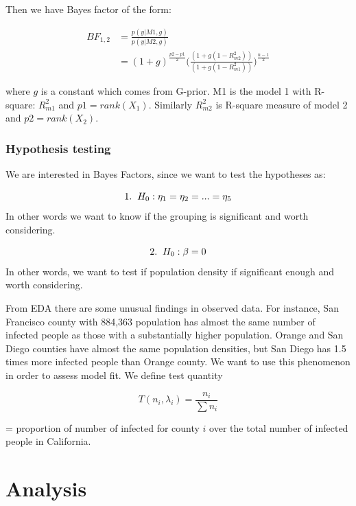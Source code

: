 \documentclass[11pt,twocolumn]{asaproc}
\begin{document}
Then we have Bayes factor of the form: 

\begin{align*}
BF_{1,2} & = \frac{p(y | M1, g)}{p(y | M2, g)} \\
&= (1+g)^{\frac{p2-p1}{2}}\Big(\frac{(1+g(1-R^2_{m2}))}{(1+g(1-R^2_{m1}))}\Big)^{\frac{n-1}{2}}
\end{align*}

where $g$ is a constant which comes from G-prior. M1 is the model 1 with R-square: $R^2_{m1}$ and $p1 = rank(X_1)$. Similarly $R^2_{m2}$ is R-square measure of model 2 and $p2 = rank(X_2)$. 



\subsubsection{Hypothesis testing}
We are interested in Bayes Factors, since we want to test the hypotheses as: 

$$1. \hspace{2mm} H_0: \eta_1 = \eta_2 = ... = \eta_5$$ In other words we want to know if the grouping is significant and worth considering. 

$$2. \hspace{2mm} H_0: \beta = 0$$ In other words, we want to test if population density if significant enough and worth considering. 



From EDA there are some unusual findings in observed data. For instance, San Francisco county with 884,363 population has almost the same number of infected people as those with a substantially higher population. Orange and San Diego counties have almost the same population densities, but San Diego has 1.5 times more infected people than Orange county. We want to use this phenomenon in order to assess model fit. We define test quantity 

$$T(n_i, \lambda_i) = \frac{n_i}{\sum n_i}$$ 

= proportion of number of infected for county $i$ over the total number of infected people in California.









\section{Analysis} %
\end{document}

